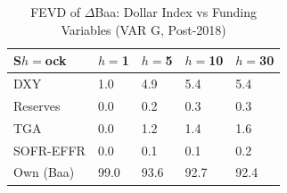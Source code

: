 \begin{table}[htbp]
\centering
\caption{FEVD of $\Delta$Baa: Dollar Index vs Funding Variables (VAR G, Post-2018)} 
\label{tab:fevd_dxy}
\begin{tabular}{lllll}
  \toprule
S$h=$ock & $h=$1 & $h=$5 & $h=$10 & $h=$30 \\ 
  \midrule
DXY & 1.0 & 4.9 & 5.4 & 5.4 \\ 
  Reserves & 0.0 & 0.2 & 0.3 & 0.3 \\ 
  TGA & 0.0 & 1.2 & 1.4 & 1.6 \\ 
  SOFR-EFFR & 0.0 & 0.1 & 0.1 & 0.2 \\ 
  Own (Baa) & 99.0 & 93.6 & 92.7 & 92.4 \\ 
   \bottomrule
\end{tabular}
\end{table}

